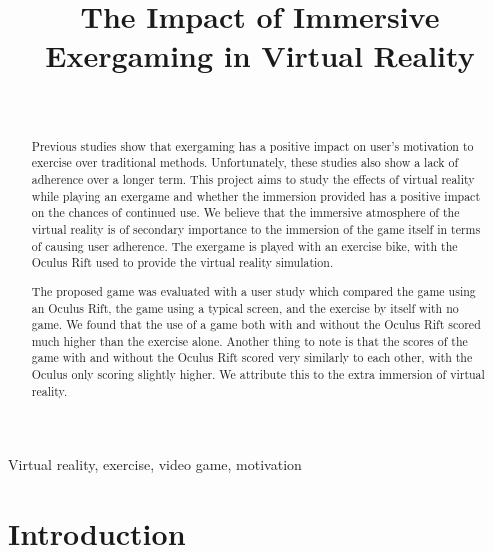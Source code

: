 \documentclass[11pt, 
]{IEEEtran}
\begin{document}
\title{The Impact of Immersive Exergaming in Virtual Reality}

\author{\\
}

\maketitle

\begin{abstract}

Previous studies show that exergaming has a positive impact on user’s motivation to exercise over traditional methods. Unfortunately, these studies also show a lack of adherence over a longer term. This project aims to study the effects of virtual reality while playing an exergame and whether the immersion provided has a positive impact on the chances of continued use. We believe that the immersive atmosphere of the virtual reality is of secondary importance to the immersion of the game itself in terms of causing user adherence. The exergame is played with an exercise bike, with the Oculus Rift used to provide the virtual reality simulation.

The proposed game was evaluated with a user study which compared the game using an Oculus Rift, the game using a typical screen, and the exercise by itself with no game. We found that the use of a game both with and without the Oculus Rift scored much higher than the exercise alone. Another thing to note is that the scores of the game with and without the Oculus Rift scored very similarly to each other, with the Oculus only scoring slightly higher. We attribute this to the extra immersion of virtual reality.
 
\end{abstract}

\begin{IEEEkeywords}
Virtual reality, exercise, video game, motivation
\end{IEEEkeywords}


\section{Introduction} \label{Introduction}
\end{document}

